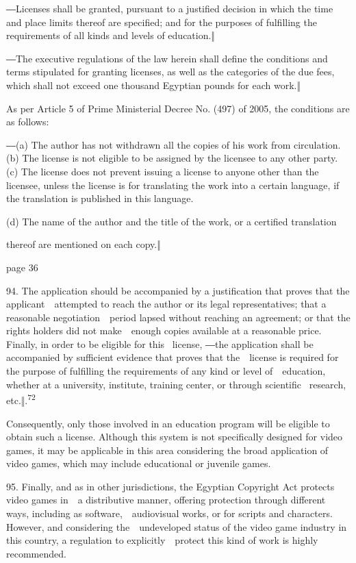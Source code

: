 \documentclass[
]{article}
\begin{document}
{―Licenses shall be granted, pursuant to a justified decision in which
the time }{and place limits thereof are specified; and for the purposes
of fulfilling the }{requirements of all kinds and levels of education.‖}

{―The executive regulations of the law herein }{shall define the
conditions and terms stipulated for granting licenses, as well as the
categories of the due }{fees, which shall not exceed one thousand
Egyptian pounds for each work.‖}

{As per Article 5 of Prime Ministerial Decree No. (497) of 2005, the
conditions are as follows:}

{―(a) The author has not withdrawn all the copies of his work from
circulation. }{(b) The license is not eligible to be assigned by the
licensee to any other party. (c) The license does not prevent issuing a
license to anyone other than the licensee, unless the license is for
translating the work into a certain language, if the translation is
published in this language.}

{(d) The name of the author and the title of the work, or a certified
translation}

{thereof are mentioned on each copy.‖}

{page 36}

{94. }{The application should be accompanied by a justification that
proves that the applicant~~attempted to reach the author or its legal
representatives; that a reasonable negotiation~~period lapsed without
reaching an agreement; or that the rights holders did not make~~enough
copies available at a reasonable price. Finally, in order to be eligible
for this }{~license, ―}{the application shall be accompanied by
sufficient evidence that proves that the~~license is required for the
purpose of fulfilling the requirements of any kind or level
of~~education, whether at a university, institute, training center, or
through scientific }{~research, etc.‖.}\textsuperscript{{72}}

{Consequently, only those involved in an education program will be
eligible to obtain such a license. Although this system is not
specifically designed for video games, it may be applicable in this area
considering the broad application of video games, which may include
educational or juvenile games.}

{95. }{Finally, and as in other jurisdictions, the Egyptian }{Copyright
Act }{protects video games in~~a distributive manner, offering
protection through different ways, including as software,~~audiovisual
works, or for scripts and characters. However, and considering
the~~undeveloped status of the video game industry in this country, a
regulation to explicitly~~protect this kind of work is highly
recommended.}
\end{document}
